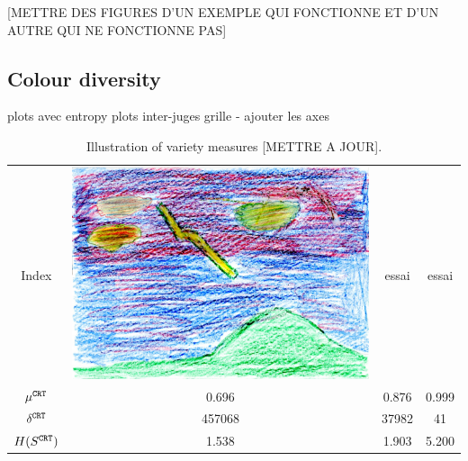 \documentclass[11pt,a4paper]{article}
\begin{document}

{[METTRE DES FIGURES D'UN EXEMPLE QUI FONCTIONNE ET D'UN AUTRE QUI NE FONCTIONNE PAS]}

\subsection{Colour diversity}




plots avec entropy
plots inter-juges
grille - ajouter les axes

\begin{table}
	\begin{tabular}[!h]{cccc}
		
		\small Index &
		\includegraphics[height=0.06\textwidth]{figures/ru09_sp_m_rf_14_03_ale-r.jpg}
		& essai & essai \\
		
		
		\small \(\mu^{\tt \scriptstyle CRT}\) & \small 0.696 & \small 0.876 &
		\small 0.999\tabularnewline
		\small \(\delta^{\tt \scriptstyle CRT}\) & \small 457068 & \small 37982
		& \small 41\tabularnewline
		\small \(H(S^{\tt \scriptstyle CRT})\) & \small 1.538 & \small 1.903 &
		\small 5.200\tabularnewline
		
	\end{tabular}
	\caption{Illustration of variety measures {[}METTRE A JOUR{]}. }
	\label{varietyill}
\end{table}
\end{document}
